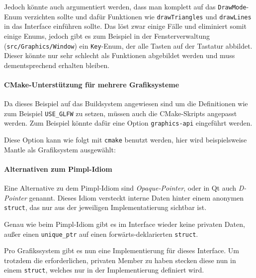 \documentclass[12pt, a4paper, titlepage, hidelinks]{scrreprt}
\begin{document}
Jedoch könnte auch argumentiert werden, dass man komplett auf das \texttt{DrawMode}-Enum verzichten sollte und dafür Funktionen wie \texttt{drawTriangles} und \texttt{drawLines} in das Interface einführen sollte. Das löst zwar einige Fälle und eliminiert somit einige Enums, jedoch gibt es zum Beispiel in der Fensterverwaltung (\texttt{src/Graphics/Window}) ein \texttt{Key}-Enum, der alle Tasten auf der Tastatur abbildet. Dieser könnte nur sehr schlecht als Funktionen abgebildet werden und muss dementsprechend erhalten bleiben.

\paragraph{CMake-Unterstützung für mehrere Grafiksysteme}
Da dieses Beispiel auf das Buildsystem angewiesen sind um die Definitionen wie zum Beispiel \texttt{USE\_GLFW} zu setzen, müssen auch die CMake-Skripts angepasst werden. Zum Beispiel könnte dafür eine Option \texttt{graphics-api} eingeführt werden.


Diese Option kann wie folgt mit \texttt{cmake} benutzt werden, hier wird beispielsweise Mantle als Grafiksystem ausgewählt:

\paragraph{Alternativen zum Pimpl-Idiom}
Eine Alternative zu dem Pimpl-Idiom sind \textit{Opaque-Pointer}, oder in Qt auch \textit{D-Pointer} genannt. Dieses Idiom versteckt interne Daten hinter einem anonymen \texttt{struct}, das nur aus der jeweiligen Implementatierung sichtbar ist. 

Genau wie beim Pimpl-Idiom gibt es im Interface wieder keine privaten Daten, außer einen \texttt{unique\_ptr} auf einen forwärts-deklarierten \texttt{struct}.


Pro Grafikssystem gibt es nun eine Implementierung für dieses Interface. Um trotzdem die erforderlichen, privaten Member zu haben stecken diese nun in einem \texttt{struct}, welches nur in der Implementierung definiert wird.
\end{document}
